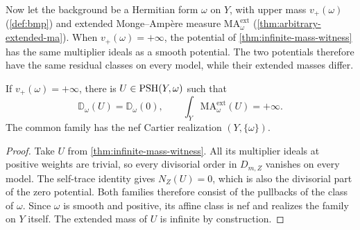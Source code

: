 Now let the background be a Hermitian form $\omega$ on $Y$, with upper mass $v_+(\omega)$ (\cref{def:bmp}) and extended Monge--Amp\`ere measure $\mathrm{MA}^{\mathrm{ext}}_\omega$ (\cref{thm:arbitrary-extended-ma}). When $v_+(\omega)=+\infty$, the potential of \cref{thm:infinite-mass-witness} has the same multiplier ideals as a smooth potential. The two potentials therefore have the same residual classes on every model, while their extended masses differ.

\begin{proposition}\label{prop:affine-bclass-infinite-mass}
If $v_+(\omega)=+\infty$, there is $U\in\mathrm{PSH}(Y,\omega)$ such that
\[
 \mathbb D_\omega(U)=\mathbb D_\omega(0),\qquad
 \int_Y\mathrm{MA}^{\mathrm{ext}}_\omega(U)=+\infty.
\]
The common family has the nef Cartier realization $(Y,\{\omega\})$.
\end{proposition}
\begin{proof}
Take $U$ from \cref{thm:infinite-mass-witness}. All its multiplier ideals at positive weights are trivial, so every divisorial order in $D_{m,Z}$ vanishes on every model. The self-trace identity gives $N_Z(U)=0$, which is also the divisorial part of the zero potential. Both families therefore consist of the pullbacks of the class of $\omega$. Since $\omega$ is smooth and positive, its affine class is nef and realizes the family on $Y$ itself. The extended mass of $U$ is infinite by construction.
\end{proof}
